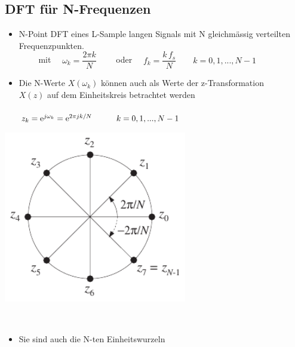	\subsection{DFT für N-Frequenzen}
		\begin{itemize}
		 \item N-Point DFT eines L-Sample langen Signals mit N gleichmässig verteilten Frequenzpunkten.\\[0.2cm]
		$\qquad$ mit $\quad \omega_k = \dfrac{2\pi k}{N}\qquad$ oder $\quad f_k = \dfrac{k\,f_s}{N}\qquad k = 0,1,...,N-1$\\[-0.3cm]
		\end{itemize}
		\begin{minipage}{0.7\textwidth}
		\begin{itemize}
		 \item Die N-Werte $X(\omega_k)$ können auch als Werte der z-Transformation\\ $X(z)$ auf dem Einheitskreis betrachtet werden\\[0.2cm]
		 \\[0.4cm]
		 $z_k = \mathrm{e}^{j\omega_k} = \mathrm{e}^{2\pi jk/N}\qquad\quad k = 0,1,...,N-1$
		\end{itemize}
		\end{minipage}
		\begin{minipage}{0.4\textwidth} 
			\includegraphics[width = 0.6\textwidth]{pic/dtftPeriodenKreis.pdf}
		\end{minipage}\\[-0.5cm]
		\begin{itemize}
		 \item Sie sind auch die N-ten Einheitswurzeln$\qquad$ 
		\end{itemize}$ $\\[-0.9cm]
		
